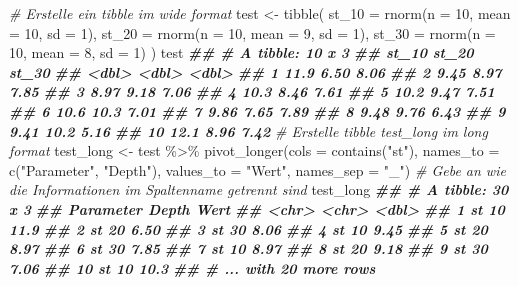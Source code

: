 \documentclass[
]{article}
\newenvironment{Shaded}{\begin{snugshade}}{\end{snugshade}}
\newcommand{\AttributeTok}[1]{\textcolor[rgb]{0.77,0.63,0.00}{#1}}
\newcommand{\CommentTok}[1]{\textcolor[rgb]{0.56,0.35,0.01}{\textit{#1}}}
\newcommand{\DecValTok}[1]{\textcolor[rgb]{0.00,0.00,0.81}{#1}}
\newcommand{\DocumentationTok}[1]{\textcolor[rgb]{0.56,0.35,0.01}{\textbf{\textit{#1}}}}
\newcommand{\FunctionTok}[1]{\textcolor[rgb]{0.00,0.00,0.00}{#1}}
\newcommand{\NormalTok}[1]{#1}
\newcommand{\OtherTok}[1]{\textcolor[rgb]{0.56,0.35,0.01}{#1}}
\newcommand{\SpecialCharTok}[1]{\textcolor[rgb]{0.00,0.00,0.00}{#1}}
\newcommand{\StringTok}[1]{\textcolor[rgb]{0.31,0.60,0.02}{#1}}
\begin{document}
\begin{Shaded}
\begin{Highlighting}[]
\CommentTok{\# Erstelle ein tibble im wide format}
\NormalTok{test }\OtherTok{\textless{}{-}} \FunctionTok{tibble}\NormalTok{(}
  \AttributeTok{st\_10 =} \FunctionTok{rnorm}\NormalTok{(}\AttributeTok{n =} \DecValTok{10}\NormalTok{, }\AttributeTok{mean =} \DecValTok{10}\NormalTok{, }\AttributeTok{sd =} \DecValTok{1}\NormalTok{), }
  \AttributeTok{st\_20 =} \FunctionTok{rnorm}\NormalTok{(}\AttributeTok{n =} \DecValTok{10}\NormalTok{, }\AttributeTok{mean =} \DecValTok{9}\NormalTok{, }\AttributeTok{sd =} \DecValTok{1}\NormalTok{), }
  \AttributeTok{st\_30 =} \FunctionTok{rnorm}\NormalTok{(}\AttributeTok{n =} \DecValTok{10}\NormalTok{, }\AttributeTok{mean =} \DecValTok{8}\NormalTok{, }\AttributeTok{sd =} \DecValTok{1}\NormalTok{) }
\NormalTok{)}
\NormalTok{test}
\DocumentationTok{\#\# \# A tibble: 10 x 3}
\DocumentationTok{\#\#    st\_10 st\_20 st\_30}
\DocumentationTok{\#\#    \textless{}dbl\textgreater{} \textless{}dbl\textgreater{} \textless{}dbl\textgreater{}}
\DocumentationTok{\#\#  1 11.9   6.50  8.06}
\DocumentationTok{\#\#  2  9.45  8.97  7.85}
\DocumentationTok{\#\#  3  8.97  9.18  7.06}
\DocumentationTok{\#\#  4 10.3   8.46  7.61}
\DocumentationTok{\#\#  5 10.2   9.47  7.51}
\DocumentationTok{\#\#  6 10.6  10.3   7.01}
\DocumentationTok{\#\#  7  9.86  7.65  7.89}
\DocumentationTok{\#\#  8  9.48  9.76  6.43}
\DocumentationTok{\#\#  9  9.41 10.2   5.16}
\DocumentationTok{\#\# 10 12.1   8.96  7.42}
\CommentTok{\# Erstelle tibble test\_long im long format}
\NormalTok{test\_long }\OtherTok{\textless{}{-}}\NormalTok{ test }\SpecialCharTok{\%\textgreater{}\%}
  \FunctionTok{pivot\_longer}\NormalTok{(}\AttributeTok{cols =} \FunctionTok{contains}\NormalTok{(}\StringTok{"st"}\NormalTok{), }\AttributeTok{names\_to =} \FunctionTok{c}\NormalTok{(}\StringTok{"Parameter"}\NormalTok{, }\StringTok{"Depth"}\NormalTok{), }\AttributeTok{values\_to =} \StringTok{"Wert"}\NormalTok{, }\AttributeTok{names\_sep =} \StringTok{"\_"}\NormalTok{) }\CommentTok{\# Gebe an wie die Informationen im Spaltenname getrennt sind}
\NormalTok{test\_long}
\DocumentationTok{\#\# \# A tibble: 30 x 3}
\DocumentationTok{\#\#    Parameter Depth  Wert}
\DocumentationTok{\#\#    \textless{}chr\textgreater{}     \textless{}chr\textgreater{} \textless{}dbl\textgreater{}}
\DocumentationTok{\#\#  1 st        10    11.9 }
\DocumentationTok{\#\#  2 st        20     6.50}
\DocumentationTok{\#\#  3 st        30     8.06}
\DocumentationTok{\#\#  4 st        10     9.45}
\DocumentationTok{\#\#  5 st        20     8.97}
\DocumentationTok{\#\#  6 st        30     7.85}
\DocumentationTok{\#\#  7 st        10     8.97}
\DocumentationTok{\#\#  8 st        20     9.18}
\DocumentationTok{\#\#  9 st        30     7.06}
\DocumentationTok{\#\# 10 st        10    10.3 }
\DocumentationTok{\#\# \# ... with 20 more rows}
\end{Highlighting}
\end{Shaded}
\end{document}
